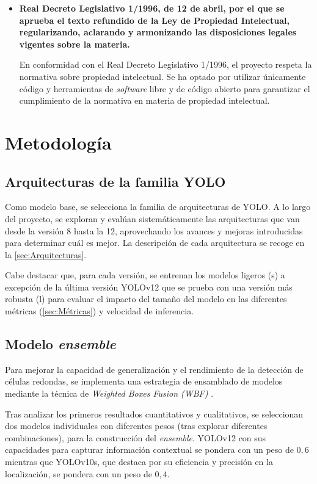 \documentclass[12pt,a4paper,onecolumn,oneside]{report}
\begin{document}
\begin{itemize}
    \item \textbf{Real Decreto Legislativo 1/1996, de 12 de abril, por el que se aprueba el texto refundido de la Ley de Propiedad Intelectual, regularizando, aclarando y armonizando las disposiciones legales vigentes sobre la materia.}\cite{RDL1996}
    
    En conformidad con el Real Decreto Legislativo 1/1996, el proyecto respeta la normativa sobre propiedad intelectual. Se ha optado por utilizar 
    únicamente código y herramientas de \textit{software} libre y de código abierto para garantizar el cumplimiento de la normativa en materia de propiedad 
    intelectual.
\end{itemize}


\chapter{Metodología} %
\label{metodologia}

\section{Arquitecturas de la familia YOLO}
\label{Arquitecturas de la familia YOLO}

Como modelo base, se selecciona la familia de arquitecturas de YOLO. A lo largo del proyecto, se exploran y evalúan sistemáticamente las arquitecturas 
que van desde la versión 8 hasta la 12, aprovechando los avances y mejoras introducidas para determinar cuál es mejor. La descripción de cada arquitectura
se recoge en la \autoref{sec:Arquitecturas}. 

Cabe destacar que, para cada versión, se entrenan los modelos ligeros (s) a excepción de la última versión YOLOv12 que se prueba con una versión más robusta (l) 
para evaluar el impacto del tamaño del modelo en las diferentes métricas (\autoref{sec:Métricas}) y velocidad de inferencia.

\section{Modelo \textit{ensemble}}
\label{sec:Modelo ensemble}

Para mejorar la capacidad de generalización y el rendimiento de la detección de células redondas, se implementa una estrategia de ensamblado de modelos mediante la técnica de \textit{Weighted Boxes Fusion (WBF)} \cite{repoTFM}. 

Tras analizar los primeros resultados cuantitativos y cualitativos, se seleccionan dos modelos individuales con diferentes pesos (tras explorar diferentes combinaciones), para la construcción del \textit{ensemble}. YOLOv12 con sus capacidades 
para capturar información contextual se pondera con un peso de $0,6$ mientras que YOLOv10s, que destaca por su eficiencia y precisión en la localización, se pondera con un peso de $0,4$.
\end{document}
